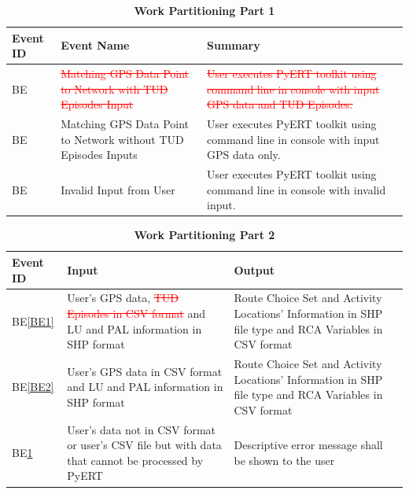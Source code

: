 \documentclass[12pt, titlepage]{article}
\newcounter{benum}
\newcommand{\bethebenum}{BE\thebenum}
\newcommand{\beref}[1]{BE\ref{#1}}
\begin{document}
\begin{table}[H]
\begin{tabular}{|p{5cm}|p{5cm}|p{5cm}|}
\hline
{\bf Event ID} & {\bf Event Name} & {\bf Summary} \\ 
\hline
 {benum} \bethebenum \label{BE1} &  \textcolor{red}{\sout{Matching GPS Data Point to Network with TUD Episodes Input}} &  \textcolor{red}{\sout{User executes PyERT toolkit using command line in console with input GPS data and TUD Episodes.}} \\ 
\hline
 {benum} \bethebenum \label{BE2} & Matching GPS Data Point to Network without TUD Episodes Inputs & User executes PyERT toolkit using command line in console with input GPS data only. \\ 
\hline
 {benum} \bethebenum \label{BE3} & Invalid Input from User & User executes PyERT toolkit using command line in console with invalid input. \\
\hline
\end{tabular}
\caption{\bf Work Partitioning Part 1}
\end{table}

\begin{table}[H]
\begin{tabular}{|p{5cm}|p{5cm}|p{5cm}|}
\hline
{\bf Event ID} & {\bf Input} & {\bf Output} \\ 
\hline
\beref{BE1} & User's GPS data,  \textcolor{red}{\sout{TUD Episodes in CSV format}} and LU and PAL information in SHP format & Route Choice Set and Activity Locations' Information in SHP file type and RCA Variables in CSV format  \\ 
\hline
\beref{BE2} & User's GPS data in CSV format and LU and PAL information in SHP format & Route Choice Set and Activity Locations' Information in SHP file type and RCA Variables in CSV format \\ 
\hline
\beref{BE3} & User's data not in CSV format or user's CSV file but with data that cannot be processed by PyERT & Descriptive error message shall be shown to the user \\ 
\hline
\end{tabular}
\caption{\bf Work Partitioning Part 2}
\end{table}

\newpage
\end{document}
